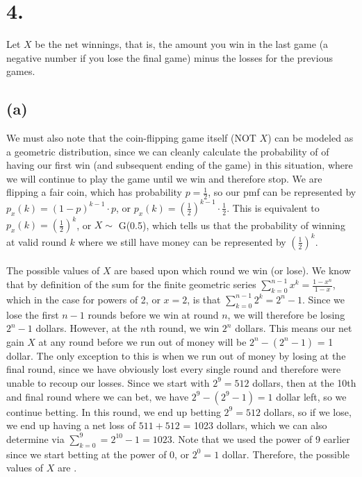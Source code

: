 \documentclass{article}
\begin{document}
\section*{4.}
{\Large 
Let $X$ be the net winnings, that is, the amount you win in the last game (a negative number if you lose the final game) minus the losses for the previous games.

\subsection*{(a)}
We must also note that the coin-flipping game itself (NOT $X$) can be modeled as a geometric distribution, since we can cleanly calculate the probability of of having our first win (and subsequent ending of the game) in this situation, where we will continue to play the game until we win and therefore stop. We are flipping a fair coin, which has probability $p = \frac{1}{2}$, so our pmf can be represented by $p_x(k) = (1-p)^{k-1} \cdot p$, or $p_x(k) = (\frac{1}{2})^{k-1} \cdot \frac{1}{2}$. This is equivalent to $p_x(k) = (\frac{1}{2})^k$, or $X \sim $ G(0.5), which tells us that the probability of winning at valid round $k$ where we still have money can be represented by $(\frac{1}{2})^k$. \\ \\ 
The possible values of $X$ are based upon which round we win (or lose). We know that by definition of the sum for the finite geometric series $\sum_{k=0}^{n-1}x^k = \frac{1 - x^n}{1 - x}$, which in the case for powers of 2, or $x = 2$, is that $\sum_{k=0}^{n-1} 2^k = 2^n - 1$. Since we lose the first $n-1$ rounds before we win at round $n$, we will therefore be losing $2^n - 1$ dollars. However, at the $n$th round, we win $2^n$ dollars. This means our net gain $X$ at any round before we run out of money will be $2^n - (2^n - 1)$ = 1 dollar. The only exception to this is when we run out of money by losing at the final round, since we have obviously lost every single round and therefore were unable to recoup our losses. Since we start with $2^9 = 512$ dollars, then at the 10th and final round where we can bet, we have $2^9 - (2^9 - 1) = 1$ dollar left, so we continue betting. In this round, we end up betting $2^9 = 512$ dollars, so if we lose, we end up having a net loss of $511 + 512$ = 1023 dollars, which we can also determine via $\sum_{k=0}^{9} = 2^10 - 1 = 1023$. Note that we used the power of 9 earlier since we start betting at the power of 0, or $2^0 = 1$ dollar. Therefore, the possible values of $X$ are .

}
\end{document}
